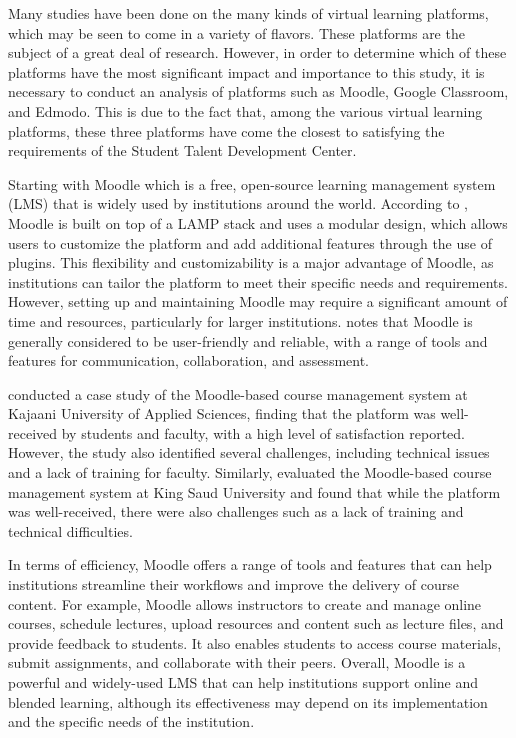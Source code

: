 \begin{justify}
\vspace{0.25cm}
\newendline Many studies have been done on the many kinds of virtual learning platforms, which may be seen to come in a variety of flavors. These platforms are the subject of a great deal of research. However, in order to determine which of these platforms have the most significant impact and importance to this study, it is necessary to conduct an analysis of platforms such as Moodle, Google Classroom, and Edmodo. This is due to the fact that, among the various virtual learning platforms, these three platforms have come the closest to satisfying the requirements of the Student Talent Development Center.

\vspace{0.25cm}
\newendline Starting with Moodle which is a free, open-source learning management system (LMS) that is widely used by institutions around the world. According to \cite{rice2006moodle}, Moodle is built on top of a LAMP stack and uses a modular design, which allows users to customize the platform and add additional features through the use of plugins. This flexibility and customizability is a major advantage of Moodle, as institutions can tailor the platform to meet their specific needs and requirements. However, setting up and maintaining Moodle may require a significant amount of time and resources, particularly for larger institutions. \cite{dougiamas2004moodle} notes that Moodle is generally considered to be user-friendly and reliable, with a range of tools and features for communication, collaboration, and assessment.

\vspace{0.25cm}
\newendline \cite{kc2017evaluation} conducted a case study of the Moodle-based course management system at Kajaani University of Applied Sciences, finding that the platform was well-received by students and faculty, with a high level of satisfaction reported. However, the study also identified several challenges, including technical issues and a lack of training for faculty. Similarly, \cite{al2008moodle} evaluated the Moodle-based course management system at King Saud University and found that while the platform was well-received, there were also challenges such as a lack of training and technical difficulties.

\vspace{0.25cm}
\newendline In terms of efficiency, Moodle offers a range of tools and features that can help institutions streamline their workflows and improve the delivery of course content. For example, Moodle allows instructors to create and manage online courses, schedule lectures, upload resources and content such as lecture files, and provide feedback to students. It also enables students to access course materials, submit assignments, and collaborate with their peers. Overall, Moodle is a powerful and widely-used LMS that can help institutions support online and blended learning, although its effectiveness may depend on its implementation and the specific needs of the institution.


\end{justify}
